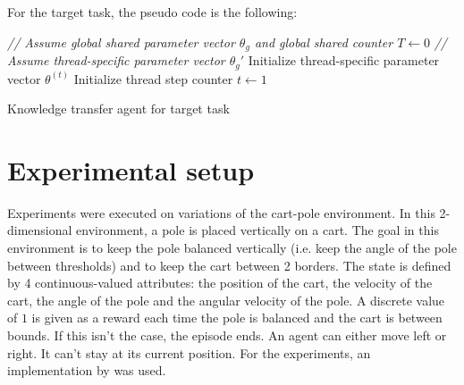 \documentclass[a4paper]{article}
\begin{document}
For the target task, the pseudo code is the following:\\
\begin{algorithm}[H]
\DontPrintSemicolon
\emph{// Assume global shared parameter vector $\theta_g$ and global shared counter $T \gets 0$}\;
\emph{// Assume thread-specific parameter vector $\theta_g'$}\;
Initialize thread-specific parameter vector $\theta^{(t)}$\;
Initialize thread step counter $t\gets 1$\;
\caption{Knowledge transfer agent for target task}
\end{algorithm}

\section{Experimental setup}
Experiments were executed on variations of the cart-pole environment.
In this 2-dimensional environment, a pole is placed vertically on a cart. The goal in this environment is to keep the pole balanced vertically (i.e. keep the angle of the pole between thresholds) and to keep the cart between 2 borders. The state is defined by 4 continuous-valued attributes: the position of the cart, the velocity of the cart, the angle of the pole and the angular velocity of the pole. A discrete value of $1$ is given as a reward each time the pole is balanced and the cart is between bounds. If this isn't the case, the episode ends. An agent can either move left or right. It can't stay at its current position. For the experiments, an implementation by \cite{Brockman2016OpenAIGym} was used.\\
\end{document}
